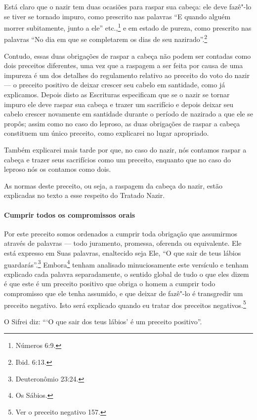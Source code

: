 \begin{multicols}{2}
Está claro que o nazir\starr{} tem duas ocasiões para raspar sua cabeça: ele
deve fazê"-lo se tiver se tornado impuro, como prescrito nas palavras ``E
quando alguém morrer subitamente, junto a ele'' etc.,\footnote{Números 6:9.} e
em estado de pureza, como prescrito nas palavras ``No dia em que se
completarem os dias de seu nazirado\starr''.\footnote{Ibid. 6:13.}

Contudo, essas duas obrigações de raspar a cabeça não podem ser contadas
como dois preceitos diferentes, uma vez que a raspagem a ser feita por
causa de uma impureza é um dos detalhes do regulamento relativo ao
preceito do voto do nazir\starr{} --- o preceito positivo de deixar crescer seu
cabelo em santidade, como já explicamos. Depois disto as Escrituras
especificam que se o nazir\starr{} se tornar impuro ele deve raspar sua cabeça e
trazer um sacrifício e depois deixar seu cabelo crescer novamente em
santidade durante o período de nazirado\starr{} a que ele se propôs; assim como
no caso do leproso, as duas obrigações de raspar a cabeça constituem um
único preceito, como explicarei no lugar apropriado.

Também explicarei mais tarde por que, no caso do nazir\starr, nós contamos
raspar a cabeça e trazer seus sacrifícios como um preceito, enquanto que
no caso do leproso nós os contamos como dois.

As normas deste preceito, ou seja, a raspagem da cabeça do nazir\starr, estão
explicadas no texto a esse respeito do Tratado Nazir\starr.

\paragraph{Cumprir todos os compromissos orais}

Por este preceito somos ordenados a cumprir toda obrigação que
assumirmos através de palavras --- todo juramento, promessa, oferenda ou
equivalente. Ele está expresso em Suas palavras, enaltecido seja Ele, ``O
que sair de teus lábios guardarás''.\footnote{Deuteronômio 23:24.}
Embora\footnote{Os Sábios.} tenham analisado minuciosamente este versículo e tenham explicado cada palavra separadamente,
o sentido global de tudo o que eles dizem é que este é um preceito
positivo que obriga o homem a cumprir todo compromisso que ele tenha
assumido, e que deixar de fazê"-lo é transgredir um preceito negativo.
Isto será explicado quando eu tratar dos preceitos
negativos.\footnote{Ver o preceito negativo 157.}

O Sifrei\starr{} diz: ```O que sair dos teus lábios' é um preceito positivo''.


\end{multicols}
